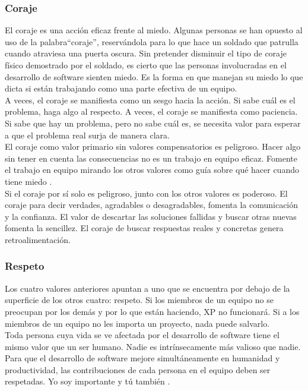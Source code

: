 \begin{spacing}{1.5}
		\subsubsection{Coraje}
		El coraje es una acción eficaz frente al miedo. Algunas personas se han opuesto al uso de la palabra``coraje'', reservándola para lo que hace un soldado que patrulla cuando atraviesa una puerta oscura. Sin pretender disminuir el tipo de coraje físico demostrado por el soldado, es cierto que las personas involucradas en el desarrollo de software sienten miedo. Es la forma en que manejan su miedo lo que dicta si están trabajando como una parte efectiva de un equipo.\\
		A veces, el coraje se manifiesta como un sesgo hacia la acción. Si sabe cuál es el problema, haga algo al respecto. A veces, el coraje se manifiesta como paciencia. Si sabe que hay un problema, pero no sabe cuál es, se necesita valor para esperar a que el problema real surja de manera clara.\\
		El coraje como valor primario sin valores compensatorios es peligroso. Hacer algo sin tener en cuenta las consecuencias no es un trabajo en equipo eficaz. Fomente el trabajo en equipo mirando los otros valores como guía sobre qué hacer cuando tiene miedo \cite{chap2_extreme_programming}.\\
		Si el coraje por sí solo es peligroso, junto con los otros valores es poderoso. El coraje para decir verdades, agradables o desagradables, fomenta la comunicación y la confianza. El valor de descartar las soluciones fallidas y buscar otras nuevas fomenta la sencillez. El coraje de buscar respuestas reales y concretas genera retroalimentación.
		\subsubsection{Respeto}
		Los cuatro valores anteriores apuntan a uno que se encuentra por debajo de la superficie de los otros cuatro: respeto. Si los miembros de un equipo no se preocupan por los demás y por lo que están haciendo, XP no funcionará. Si a los miembros de un equipo no les importa un proyecto, nada puede salvarlo.\\
		Toda persona cuya vida se ve afectada por el desarrollo de software tiene el mismo valor que un ser humano. Nadie es intrínsecamente más valioso que nadie. Para que el desarrollo de software mejore simultáneamente en humanidad y productividad, las contribuciones de cada persona en el equipo deben ser respetadas. Yo soy importante y tú también \cite{chap2_extreme_programming}.

\end{spacing}
